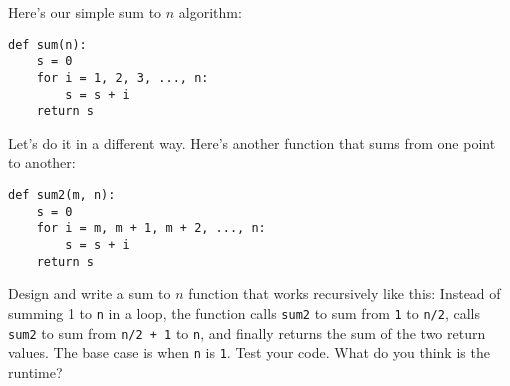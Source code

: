 Here's our simple sum to $n$ algorithm:
\begin{Verbatim}[frame=single, fontsize=\footnotesize]
def sum(n):
    s = 0
    for i = 1, 2, 3, ..., n:
        s = s + i
    return s
\end{Verbatim}
Let's do it in a different way.
Here's another function that sums from one point to another:
\begin{Verbatim}[frame=single, fontsize=\footnotesize]
def sum2(m, n):
    s = 0
    for i = m, m + 1, m + 2, ..., n:
        s = s + i
    return s
\end{Verbatim}
Design and write a sum to $n$ function that works recursively like this:
Instead of summing 1 to \verb!n! in a loop, the function
calls \verb!sum2! to sum from \verb!1! to \verb!n/2!, 
calls \verb!sum2! to sum from 
\verb!n/2 + 1! to \verb!n!, 
and finally returns the sum of the two return values.
The base case is when \verb!n! is \verb!1!.
Test your code.
What do you think is the runtime?
